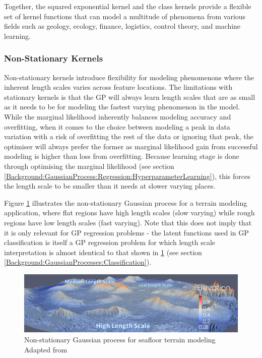 				Together, the squared exponential kernel and the \matern class kernels provide a flexible set of kernel functions that can model a multitude of phenomena from various fields such as geology, ecology, finance, logistics, control theory, and machine learning.
			
			\subsubsection{Non-Stationary Kernels}
			\label{Background:GaussianProcesses:KernelFunctions:Nonstationary}
			
				Non-stationary kernels introduce flexibility for modeling phenomenons where the inherent length scales varies across feature locations. The limitations with stationary kernels is that the GP will always learn length scales that are as small as it needs to be for modeling the fastest varying phenomenon in the model. While the marginal likelihood inherently balances modeling accuracy and overfitting, when it comes to the choice between modeling a peak in data variation with a risk of overfitting the rest of the data or ignoring that peak, the optimiser will always prefer the former as marginal likelihood gain from successful modeling is higher than loss from overfitting. Because learning stage is done through optimising the marginal likelihood (see section \ref{Background:GaussianProcess:Regression:HyperparameterLearning}), this forces the length scale to be smaller than it needs at slower varying places.

				Figure \ref{Figure:GaussianProcessLengthScale} illustrates the non-stationary Gaussian process for a terrain modeling application, where flat regions have high length scales (slow varying) while rough regions have low length scales (fast varying). Note that this does not imply that it is only relevant for GP regression problems - the latent functions used in GP classification is itself a GP regression problem for which length scale interpretation is almost identical to that shown in \cref{Figure:GaussianProcessLengthScale} (see section \ref{Background:GaussianProcesses:Classification}).
				
				\begin{figure}[!htbp]
					\centering
						\includegraphics[width=\textwidth]{Figures/gaussianprocesslengthscale.png}
					\caption{Non-stationary Gaussian process for seafloor terrain modeling Adapted from \cite{ROB:ROB21403}}
					\label{Figure:GaussianProcessLengthScale}
				\end{figure}
				
